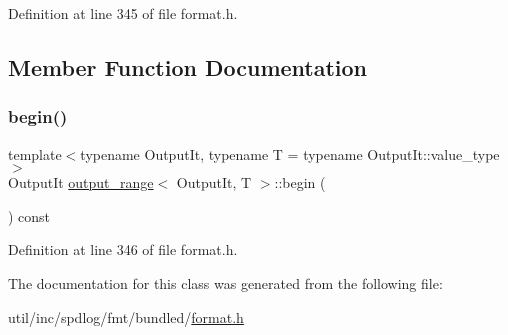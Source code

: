 Definition at line 345 of file format.\+h.



\subsection{Member Function Documentation}
\mbox{\label{classoutput__range_ac870e85d80e636c0304e3a9994901dec}} 
\subsubsection{\texorpdfstring{begin()}{begin()}}
{\footnotesize\ttfamily template$<$typename Output\+It, typename T = typename Output\+It\+::value\+\_\+type$>$ \\
Output\+It \hyperlink{classoutput__range}{output\+\_\+range}$<$ Output\+It, T $>$\+::begin (\begin{DoxyParamCaption}{ }\end{DoxyParamCaption}) const\hspace{0.3cm}{\ttfamily [inline]}}



Definition at line 346 of file format.\+h.



The documentation for this class was generated from the following file\+:\begin{DoxyCompactItemize}
\item 
util/inc/spdlog/fmt/bundled/\hyperlink{format_8h}{format.\+h}\end{DoxyCompactItemize}
